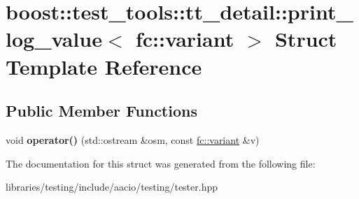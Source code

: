 \hypertarget{structboost_1_1test__tools_1_1tt__detail_1_1print__log__value_3_01fc_1_1variant_01_4}{}\section{boost\+:\+:test\+\_\+tools\+:\+:tt\+\_\+detail\+:\+:print\+\_\+log\+\_\+value$<$ fc\+:\+:variant $>$ Struct Template Reference}
\label{structboost_1_1test__tools_1_1tt__detail_1_1print__log__value_3_01fc_1_1variant_01_4}
\subsection*{Public Member Functions}
\begin{DoxyCompactItemize}
\item 
\mbox{\label{structboost_1_1test__tools_1_1tt__detail_1_1print__log__value_3_01fc_1_1variant_01_4_a957c5fa7c9cb5c2404ebd83c43c8568e}} 
void {\bfseries operator()} (std\+::ostream \&osm, const \mbox{\hyperlink{classfc_1_1variant}{fc\+::variant}} \&v)
\end{DoxyCompactItemize}


The documentation for this struct was generated from the following file\+:\begin{DoxyCompactItemize}
\item 
libraries/testing/include/aacio/testing/tester.\+hpp\end{DoxyCompactItemize}

